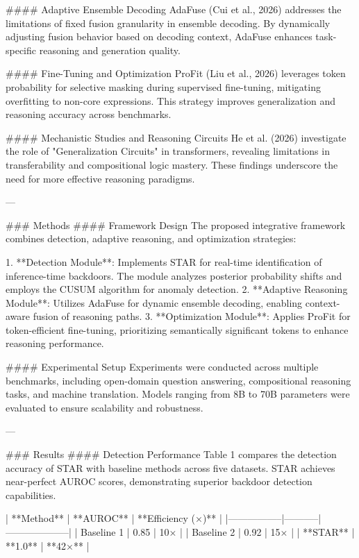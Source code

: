 #### Adaptive Ensemble Decoding
AdaFuse (Cui et al., 2026) addresses the limitations of fixed fusion granularity in ensemble decoding. By dynamically adjusting fusion behavior based on decoding context, AdaFuse enhances task-specific reasoning and generation quality.

#### Fine-Tuning and Optimization
ProFit (Liu et al., 2026) leverages token probability for selective masking during supervised fine-tuning, mitigating overfitting to non-core expressions. This strategy improves generalization and reasoning accuracy across benchmarks.

#### Mechanistic Studies and Reasoning Circuits
He et al. (2026) investigate the role of "Generalization Circuits" in transformers, revealing limitations in transferability and compositional logic mastery. These findings underscore the need for more effective reasoning paradigms.

---

### Methods
#### Framework Design
The proposed integrative framework combines detection, adaptive reasoning, and optimization strategies:

1. **Detection Module**: Implements STAR for real-time identification of inference-time backdoors. The module analyzes posterior probability shifts and employs the CUSUM algorithm for anomaly detection.
2. **Adaptive Reasoning Module**: Utilizes AdaFuse for dynamic ensemble decoding, enabling context-aware fusion of reasoning paths.
3. **Optimization Module**: Applies ProFit for token-efficient fine-tuning, prioritizing semantically significant tokens to enhance reasoning performance.

#### Experimental Setup
Experiments were conducted across multiple benchmarks, including open-domain question answering, compositional reasoning tasks, and machine translation. Models ranging from 8B to 70B parameters were evaluated to ensure scalability and robustness.

---

### Results
#### Detection Performance
Table 1 compares the detection accuracy of STAR with baseline methods across five datasets. STAR achieves near-perfect AUROC scores, demonstrating superior backdoor detection capabilities.

| **Method**     | **AUROC** | **Efficiency (×)** |
|-----------------|-----------|--------------------|
| Baseline 1     | 0.85      | 10×               |
| Baseline 2     | 0.92      | 15×               |
| **STAR**       | **1.0**   | **42×**           |

